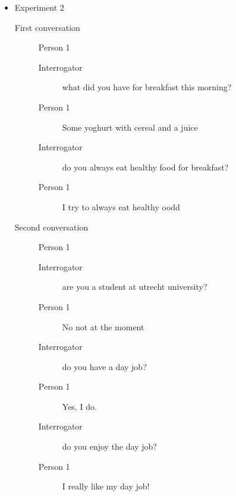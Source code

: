 \begin{itemize}
   \item Experiment 2
      \begin{description}
         \item [First conversation] Person 1
            \begin{description}
               \item [Interrogator] what did you have for breakfast this morning?
               \item [Person 1] Some yoghurt with cereal and a juice
               \item [Interrogator] do you always eat healthy food for breakfast?
               \item [Person 1] I try to always eat healthy oodd
            \end{description}
         \item [Second conversation] Person 1
            \begin{description}
               \item [Interrogator] are you a student at utrecht university?
               \item [Person 1] No not at the moment
               \item [Interrogator] do you have a day job?
               \item [Person 1] Yes, I do.
               \item [Interrogator] do you enjoy the day job?
               \item [Person 1] I really like my day job!
            \end{description}
      \end{description}



\end{itemize}

